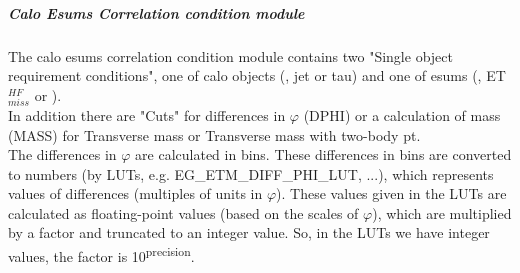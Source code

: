 
\subparagraph{Calo Esums Correlation condition module}
\label{sec:gtl:calo_esums_correlation_condition_module}

The calo esums correlation condition module contains two "Single object requirement conditions", one of calo objects (\egamma, jet or tau) and one of esums (\etm, ET$_{miss}^{HF}$ or \htm).\\
In addition there are "Cuts" for differences in $\varphi$ (DPHI) or a calculation of mass (MASS) for Transverse mass or Transverse mass with two-body pt.\\
The differences in $\varphi$ are calculated in bins. 
These differences in bins are converted to numbers (by LUTs, e.g. \small{EG\_ETM\_DIFF\_PHI\_LUT}\normalsize, ...),
which represents values of differences (multiples of units in $\varphi$).
These values given in the LUTs are calculated as floating-point values (based on the scales of $\varphi$), which are multiplied by a factor and truncated to an integer value.
So, in the LUTs we have integer values, the factor is 10\textsuperscript{\tiny{precision}\normalsize}.\\

